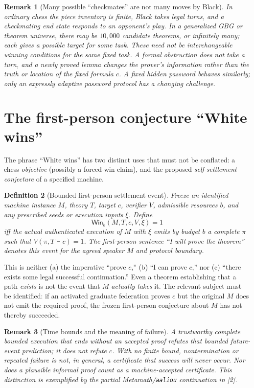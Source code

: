 \documentclass[11pt,letterpaper]{article}
\newtheorem{definition}{Definition}[section]
\newtheorem{remark}[definition]{Remark}
\newcommand{\Win}{\mathsf{Win}}
\begin{document}
\begin{remark}[Many possible ``checkmates'' are not many moves by Black]
In ordinary chess the piece inventory is finite, Black takes legal turns, and a checkmating end state responds to an opponent's play. In a generalized GBG or theorem universe, there may be $10{,}000$ candidate theorems, or infinitely many; each gives a possible target for some task. These need not be interchangeable winning conditions for the \emph{same} fixed task. A formal obstruction does not take a turn, and a newly proved lemma changes the prover's information rather than the truth or location of the fixed formula $c$. A fixed hidden password behaves similarly; only an expressly adaptive password protocol has a changing challenge.
\end{remark}

\section{The first-person conjecture ``White wins''}
The phrase ``White wins'' has two distinct uses that must not be conflated: a chess \emph{objective} (possibly a forced-win claim), and the proposed \emph{self-settlement conjecture} of a specified machine.

\begin{definition}[Bounded first-person settlement event]
Freeze an identified machine instance $M$, theory $T$, target $c$, verifier $V$, admissible resources $b$, and any prescribed seeds or execution inputs $\xi$. Define
\[
\Win_b(M,T,c,V,\xi)=1
\]
iff the actual authenticated execution of $M$ with $\xi$ emits by budget $b$ a complete $\pi$ such that $V(\pi,T\vdash c)=1$. The first-person sentence ``I will prove the theorem'' denotes this event for the agreed speaker $M$ and protocol boundary.
\end{definition}
This is neither (a) the imperative ``prove $c$,'' (b) ``I can prove $c$,'' nor (c) ``there exists some legal successful continuation.'' Even a theorem establishing that a path \emph{exists} is not the event that $M$ \emph{actually takes} it. The relevant subject must be identified: if an activated graduate federation proves $c$ but the original $M$ does not emit the required proof, the frozen first-person conjecture about $M$ has not thereby succeeded.

\begin{remark}[Time bounds and the meaning of failure]
A trustworthy complete bounded execution that ends without an accepted proof refutes that \emph{bounded future-event prediction}; it does not refute $c$. With no finite bound, nontermination or repeated failure is not, in general, a certificate that success will never occur. Nor does a plausible informal proof count as a machine-accepted certificate. This distinction is exemplified by the partial Metamath/\texttt{aaliou} continuation in [2].
\end{remark}
\end{document}
